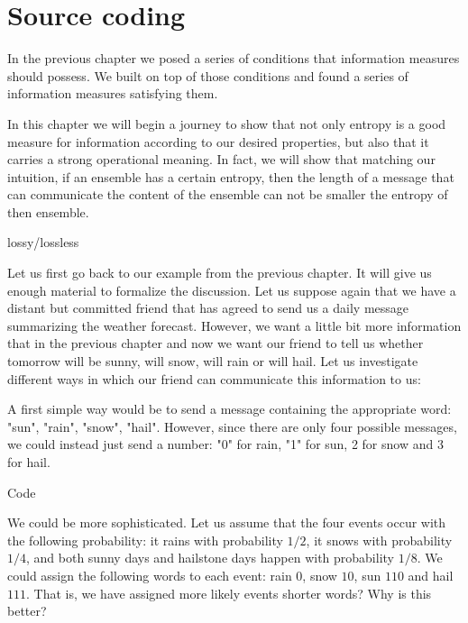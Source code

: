 \usechapterimagetrue
{} 
\chapter{Source coding}
\usechapterimagefalse
In the previous chapter we posed a series of conditions that information measures should possess. We built on top of those conditions and found a series of information measures satisfying them. 

In this chapter we will begin a journey to show that not only entropy is a good measure for information according to our desired properties, but also that it carries a strong operational meaning. In fact, we will show that matching  our intuition, if an ensemble has a certain entropy, then the length of a message that can communicate the content of the ensemble can not be smaller the entropy of then ensemble. 


lossy/lossless

Let us first go back to our example from the previous chapter. It will give us enough material to formalize the discussion. Let us suppose again that we have a distant but committed friend that has agreed to send us a daily message summarizing the weather forecast. However, we want a little bit more information that in the previous chapter and now we want our friend to tell us whether tomorrow will be sunny, will snow, will rain or will hail. Let us investigate different ways in which our friend can communicate this information to us:

A first simple way would be to send a message containing the appropriate word: "sun", "rain", "snow", "hail". However, since there are only four possible messages, we could instead just send a number: "0" for rain, "1" for sun, 2 for snow and 3 for hail. 

\begin{definition}
Code
\end{definition}
We could be more sophisticated. Let us assume that the four events occur with the following probability: it rains with probability $1/2$, it snows with probability $1/4$, and both sunny days and hailstone days happen with probability $1/8$. We could assign the following words to each event: rain $0$, snow $10$, sun $110$ and hail $111$. That is, we have assigned more likely events shorter words? Why is this better?


